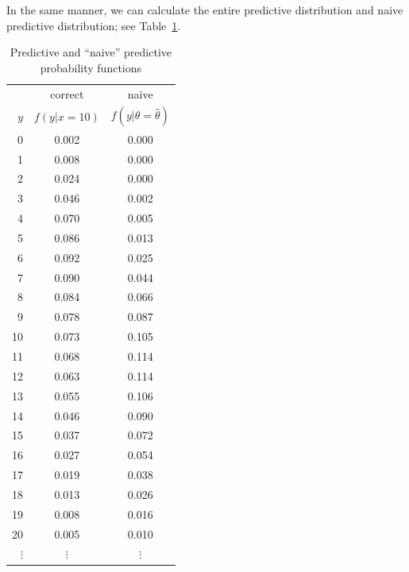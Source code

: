 {In the same manner, we can calculate the entire predictive distribution
and naive predictive distribution; see Table~\ref{tab:predsimple}.



\begin{table}[ht]
\bigskip

\begin{tabular}{|r|c|c|}
\cline{2-3}
\multicolumn{1}{c|}{~}& correct & naive \\
\cline{1-1}
$y$ & $f(y|x=10)$ & $f(y|\theta=\hat{\theta})$ \\
\hline
0 & 0.002 & 0.000 \\
1 & 0.008 & 0.000 \\
2 & 0.024 & 0.000 \\
3 & 0.046 & 0.002 \\
4 & 0.070 & 0.005 \\
5 & 0.086 & 0.013 \\
6 & 0.092 & 0.025 \\
7 & 0.090 & 0.044 \\
8 & 0.084 & 0.066 \\
9 & 0.078 & 0.087 \\
10 & 0.073 & 0.105 \\
11 & 0.068 & 0.114 \\
12 & 0.063 & 0.114 \\
13 & 0.055 & 0.106 \\
14 & 0.046 & 0.090 \\
15 & 0.037 & 0.072 \\
16 & 0.027 & 0.054 \\
17 & 0.019 & 0.038 \\
18 & 0.013 & 0.026 \\
19 & 0.008 & 0.016 \\
20 & 0.005 & 0.010 \\
$\vdots$ & $\vdots$ & $\vdots$ \\
\hline
\end{tabular}
\caption{Predictive and ``naive'' predictive probability functions}
\label{tab:predsimple}


\end{table}}
